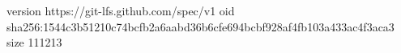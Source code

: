 version https://git-lfs.github.com/spec/v1
oid sha256:1544c3b51210c74bcfb2a6aabd36b6cfe694bcbf928af4fb103a433ac4f3aca3
size 111213
